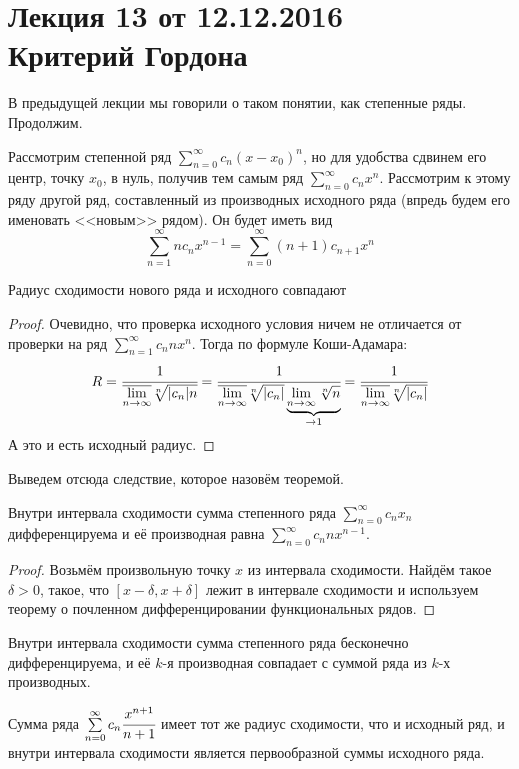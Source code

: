 \documentclass[a4paper, 12pt]{article}
\begin{document}
\pagestyle{fancy}
\section{Лекция 13 от 12.12.2016 \\ Критерий Гордона}

В предыдущей лекции мы говорили о таком понятии, как степенные ряды. Продолжим.
\par Рассмотрим степенной ряд $\sum\limits_{n = 0}^{\infty}c_n (x-x_0)^n$, но для удобства сдвинем его центр, точку $x_0$, в нуль, получив тем самым ряд $\sum\limits_{n = 0}^{\infty}c_n x^n$. Рассмотрим к этому ряду другой ряд, составленный из производных исходного ряда (впредь будем его именовать <<новым>> рядом). Он будет иметь вид
\[
    \sum\limits_{n = 1}^{\infty}nc_n x^{n - 1} = \sum\limits_{n = 0}^{\infty}(n+1)c_{n + 1} x^n
\]
\begin{Statement}
    Радиус сходимости нового ряда и исходного совпадают
\end{Statement}
\begin{proof}
    Очевидно, что проверка исходного условия ничем не отличается от проверки на ряд $\sum\limits_{n = 1}^{\infty}c_n n x^n$. Тогда по формуле Коши-Адамара:
    \[ 
        R = \cfrac{1}{\overline{\lim\limits_{n\to\infty}}\sqrt[n]{|c_n|n}} = \cfrac{1}{\overline{\lim\limits_{n\to\infty}}\sqrt[n]{|c_n|}\underbrace{\lim\limits_{n\to\infty}\sqrt[n]{n}}_{\to 1}} = \cfrac{1}{\overline{\lim\limits_{n\to\infty}}\sqrt[n]{|c_n|}}
    \]
    А это и есть исходный радиус.
\end{proof}
Выведем отсюда следствие, которое назовём теоремой.
\begin{Theorem}
    Внутри интервала сходимости сумма степенного ряда $\sum\limits_{n=0}^{\infty}c_nx_n$ дифференцируема и её производная равна $\sum\limits_{n=0}^{\infty}c_n n x^{n-1}$.
\end{Theorem}
\begin{proof}
    Возьмём произвольную точку $x$ из интервала сходимости. Найдём такое $\delta > 0$, такое, что $[x-\delta, x + \delta]$ лежит в интервале сходимости и используем теорему о почленном дифференцировании функциональных рядов.
\end{proof}
\begin{Consequence}
    Внутри интервала сходимости сумма степенного ряда бесконечно дифференцируема, и её $k$-я производная совпадает с суммой ряда из $k$-х производных.
\end{Consequence}
\begin{Consequence}
    Сумма ряда $\sum\limits_{n=0}^{\infty}c_n \cfrac{x^{n+1}}{n + 1}$ имеет тот же радиус сходимости, что и исходный ряд, и внутри интервала сходимости является первообразной суммы исходного ряда.
\end{Consequence}
\end{document}
